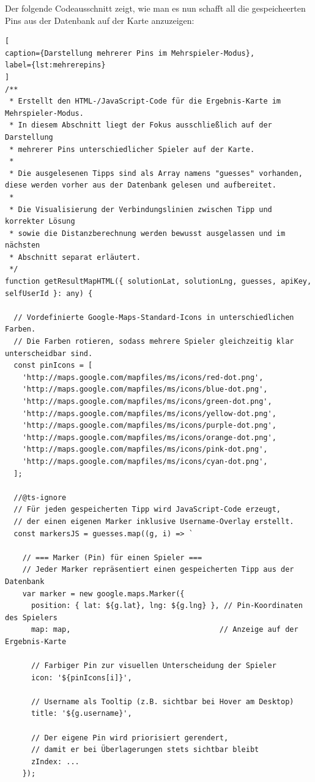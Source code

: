 Der folgende Codeausschnitt zeigt, wie man es nun schafft all die gespeicheerten Pins aus der Datenbank auf der Karte anzuzeigen:
\begin{lstlisting}[
caption={Darstellung mehrerer Pins im Mehrspieler-Modus},
label={lst:mehrerepins}
] 
/**
 * Erstellt den HTML-/JavaScript-Code für die Ergebnis-Karte im Mehrspieler-Modus.
 * In diesem Abschnitt liegt der Fokus ausschließlich auf der Darstellung
 * mehrerer Pins unterschiedlicher Spieler auf der Karte.
 *
 * Die ausgelesenen Tipps sind als Array namens "guesses" vorhanden, diese werden vorher aus der Datenbank gelesen und aufbereitet.
 *
 * Die Visualisierung der Verbindungslinien zwischen Tipp und korrekter Lösung
 * sowie die Distanzberechnung werden bewusst ausgelassen und im nächsten
 * Abschnitt separat erläutert.
 */
function getResultMapHTML({ solutionLat, solutionLng, guesses, apiKey, selfUserId }: any) {

  // Vordefinierte Google-Maps-Standard-Icons in unterschiedlichen Farben.
  // Die Farben rotieren, sodass mehrere Spieler gleichzeitig klar unterscheidbar sind.
  const pinIcons = [
    'http://maps.google.com/mapfiles/ms/icons/red-dot.png',
    'http://maps.google.com/mapfiles/ms/icons/blue-dot.png',
    'http://maps.google.com/mapfiles/ms/icons/green-dot.png',
    'http://maps.google.com/mapfiles/ms/icons/yellow-dot.png',
    'http://maps.google.com/mapfiles/ms/icons/purple-dot.png',
    'http://maps.google.com/mapfiles/ms/icons/orange-dot.png',
    'http://maps.google.com/mapfiles/ms/icons/pink-dot.png',
    'http://maps.google.com/mapfiles/ms/icons/cyan-dot.png',
  ];

  //@ts-ignore
  // Für jeden gespeicherten Tipp wird JavaScript-Code erzeugt,
  // der einen eigenen Marker inklusive Username-Overlay erstellt.
  const markersJS = guesses.map((g, i) => `

    // === Marker (Pin) für einen Spieler ===
    // Jeder Marker repräsentiert einen gespeicherten Tipp aus der Datenbank
    var marker = new google.maps.Marker({
      position: { lat: ${g.lat}, lng: ${g.lng} }, // Pin-Koordinaten des Spielers
      map: map,                                  // Anzeige auf der Ergebnis-Karte

      // Farbiger Pin zur visuellen Unterscheidung der Spieler
      icon: '${pinIcons[i]}',

      // Username als Tooltip (z.B. sichtbar bei Hover am Desktop)
      title: '${g.username}',

      // Der eigene Pin wird priorisiert gerendert,
      // damit er bei Überlagerungen stets sichtbar bleibt
      zIndex: ...
    });


\end{lstlisting}
